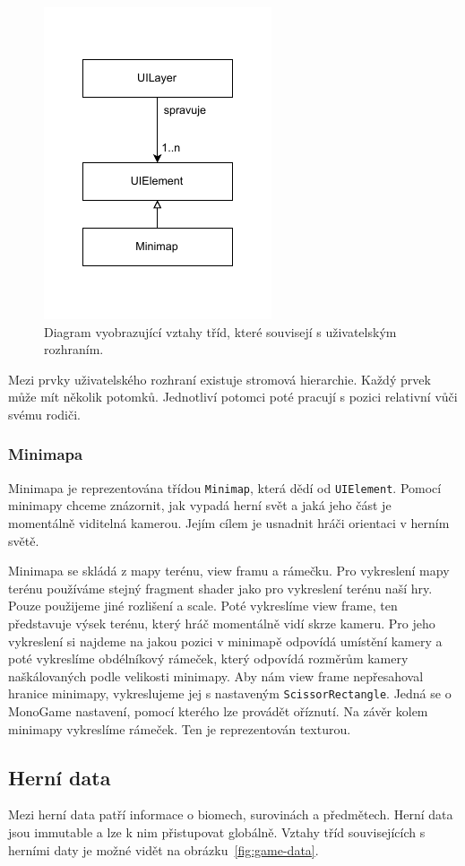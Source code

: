 \begin{figure}[!htb]
  \centering
  \includegraphics[width=0.35\linewidth]{img/ui-layer.pdf}
  \caption{Diagram vyobrazující vztahy tříd, které souvisejí s uživatelským rozhraním.}
  \label{fig:ui-layer}
\end{figure}

Mezi prvky uživatelského rozhraní existuje stromová hierarchie. Každý prvek může mít několik potomků. Jednotliví potomci poté pracují s pozici relativní vůči svému rodiči.

\subsubsection{Minimapa}
Minimapa je reprezentována třídou \texttt{Minimap}, která dědí od \texttt{UIElement}. Pomocí minimapy chceme znázornit, jak vypadá herní svět a jaká jeho část je momentálně viditelná kamerou. Jejím cílem je usnadnit hráči orientaci v herním světě.

Minimapa se skládá z mapy terénu, view framu a rámečku. Pro vykreslení mapy terénu používáme stejný fragment shader jako pro vykreslení terénu naší hry. Pouze použijeme jiné rozlišení a scale. Poté vykreslíme view frame, ten představuje výsek terénu, který hráč momentálně vidí skrze kameru. Pro jeho vykreslení si najdeme na jakou pozici v minimapě odpovídá umístění kamery a poté vykreslíme obdélníkový rámeček, který odpovídá rozměrům kamery naškálovaných podle velikosti minimapy. Aby nám view frame nepřesahoval hranice minimapy, vykreslujeme jej s nastaveným \texttt{ScissorRectangle}. Jedná se o MonoGame nastavení, pomocí kterého lze provádět oříznutí. Na závěr kolem minimapy vykreslíme rámeček. Ten je reprezentován texturou.

\subsection{Herní data}
Mezi herní data patří informace o biomech, surovinách a předmětech. Herní data jsou immutable a lze k nim přistupovat globálně. Vztahy tříd souvisejících s herními daty je možné vidět na obrázku~\ref{fig:game-data}.

